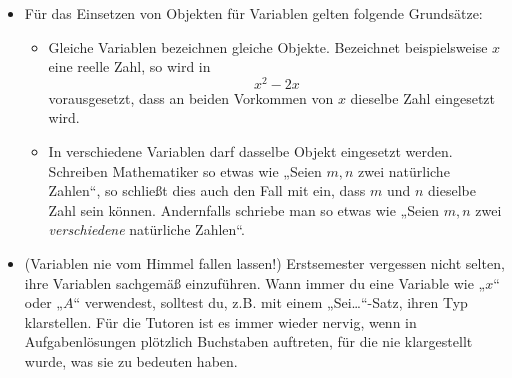 \begin{bem} \quad
    \begin{itemize}
        \item Für das Einsetzen von Objekten für Variablen gelten folgende Grundsätze:
        \begin{itemize}
            \item Gleiche Variablen bezeichnen gleiche Objekte. Bezeichnet beispielsweise $x$ eine reelle Zahl, so wird in
                \[ x^2-2x \]
            vorausgesetzt, dass an beiden Vorkommen von $x$ dieselbe Zahl eingesetzt wird.
            \item In verschiedene Variablen darf dasselbe Objekt eingesetzt werden. Schreiben Mathematiker so etwas wie „Seien $m,n$ zwei natürliche Zahlen“, so schließt dies auch den Fall mit ein, dass $m$ und $n$ dieselbe Zahl sein können. Andernfalls schriebe man so etwas wie „Seien $m,n$ zwei \emph{verschiedene} natürliche Zahlen“.
        \end{itemize}
        \item(Variablen nie vom Himmel fallen lassen!) Erstsemester vergessen nicht selten, ihre Variablen sachgemäß einzuführen. Wann immer du eine Variable wie „$x$“ oder „$A$“ verwendest, solltest du, z.B. mit einem „Sei\dots“-Satz, ihren Typ klarstellen. Für die Tutoren ist es immer wieder nervig, wenn in Aufgabenlösungen plötzlich Buchstaben auftreten, für die nie klargestellt wurde, was sie zu bedeuten haben.
    \end{itemize}
\end{bem}


